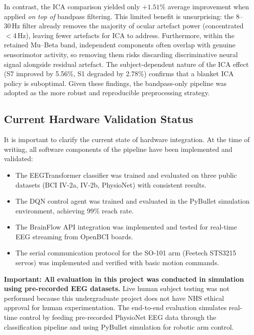 \documentclass[12pt, a4paper]{article}
\begin{document}
In contrast, the ICA comparison yielded only $+1.51\%$ average improvement when applied \emph{on top of} bandpass filtering. This limited benefit is unsurprising: the 8--30\,Hz filter already removes the majority of ocular artefact power (concentrated $<$4\,Hz), leaving fewer artefacts for ICA to address. Furthermore, within the retained Mu--Beta band, independent components often overlap with genuine sensorimotor activity, so removing them risks discarding discriminative neural signal alongside residual artefact. The subject-dependent nature of the ICA effect (S7 improved by 5.56\%, S1 degraded by 2.78\%) confirms that a blanket ICA policy is suboptimal. Given these findings, the bandpass-only pipeline was adopted as the more robust and reproducible preprocessing strategy.

\subsection{Current Hardware Validation Status}

It is important to clarify the current state of hardware integration. At the time of writing, all software components of the pipeline have been implemented and validated:
\begin{itemize}
    \item The EEGTransformer classifier was trained and evaluated on three public datasets (BCI IV-2a, IV-2b, PhysioNet) with consistent results.
    \item The DQN control agent was trained and evaluated in the PyBullet simulation environment, achieving 99\% reach rate.
    \item The BrainFlow API integration was implemented and tested for real-time EEG streaming from OpenBCI boards.
    \item The serial communication protocol for the SO-101 arm (Feetech STS3215 servos) was implemented and verified with basic motion commands.
\end{itemize}

\textbf{Important: All evaluation in this project was conducted in simulation using pre-recorded EEG datasets.} Live human subject testing was not performed because this undergraduate project does not have NHS ethical approval for human experimentation. The end-to-end evaluation simulates real-time control by feeding pre-recorded PhysioNet EEG data through the classification pipeline and using PyBullet simulation for robotic arm control.
\end{document}
